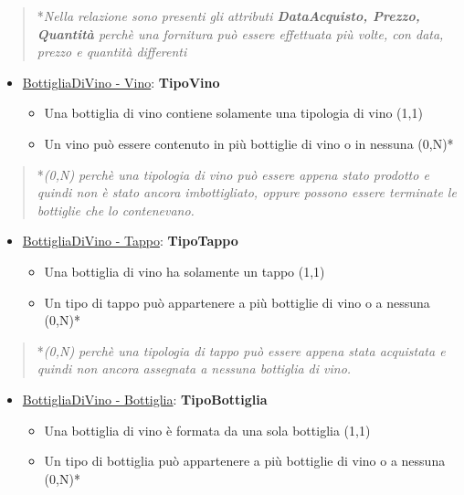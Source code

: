 \begin{verse}
*\emph{Nella relazione sono presenti gli attributi \textbf{DataAcquisto, Prezzo, Quantità} perchè una fornitura può essere effettuata più volte, con data, prezzo e quantità differenti}
\end{verse}


\begin{itemize}
	\item \underline{BottigliaDiVino - Vino}: \textbf{TipoVino}
	
	\begin{itemize}
		\item Una bottiglia di vino contiene solamente una tipologia di vino (1,1)
		\item Un vino può essere contenuto in più bottiglie di vino o in nessuna (0,N)*
	\end{itemize}
	
\end{itemize}

\begin{verse}
	*\emph{(0,N) perchè una tipologia di vino può essere appena stato prodotto e quindi non è stato ancora imbottigliato, oppure possono essere terminate le bottiglie che lo contenevano.}
\end{verse}

\begin{itemize}
	\item \underline{BottigliaDiVino - Tappo}: \textbf{TipoTappo}
	
	\begin{itemize}
		\item Una bottiglia di vino ha solamente un tappo (1,1)
		\item Un tipo di tappo può appartenere a più bottiglie di vino o a nessuna (0,N)*
	\end{itemize}
	
\end{itemize}

\begin{verse}
	*\emph{(0,N) perchè una tipologia di tappo può essere appena stata acquistata e quindi non ancora assegnata a nessuna bottiglia di vino.}
\end{verse}

\begin{itemize}
	\item \underline{BottigliaDiVino - Bottiglia}: \textbf{TipoBottiglia}
	
	\begin{itemize}
		\item Una bottiglia di vino è formata da una sola bottiglia (1,1)
		\item Un tipo di bottiglia può appartenere a più bottiglie di vino o a nessuna (0,N)*
	\end{itemize}
	
\end{itemize}

